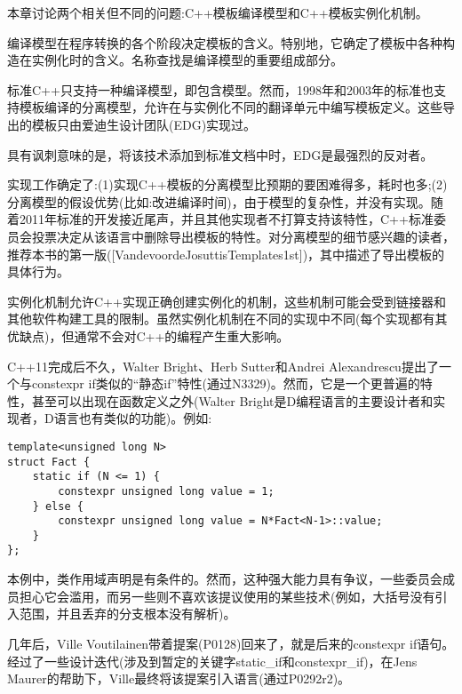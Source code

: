 本章讨论两个相关但不同的问题:C++模板编译模型和C++模板实例化机制。

编译模型在程序转换的各个阶段决定模板的含义。特别地，它确定了模板中各种构造在实例化时的含义。名称查找是编译模型的重要组成部分。

标准C++只支持一种编译模型，即包含模型。然而，1998年和2003年的标准也支持模板编译的分离模型，允许在与实例化不同的翻译单元中编写模板定义。这些导出的模板只由爱迪生设计团队(EDG)实现过。

\begin{tcolorbox}[colback=webgreen!5!white,colframe=webgreen!75!black]
\hspace*{0.75cm}具有讽刺意味的是，将该技术添加到标准文档中时，EDG是最强烈的反对者。
\end{tcolorbox}

实现工作确定了:(1)实现C++模板的分离模型比预期的要困难得多，耗时也多;(2)分离模型的假设优势(比如:改进编译时间)，由于模型的复杂性，并没有实现。随着2011年标准的开发接近尾声，并且其他实现者不打算支持该特性，C++标准委员会投票决定从该语言中删除导出模板的特性。对分离模型的细节感兴趣的读者，推荐本书的第一版([VandevoordeJosuttisTemplates1st])，其中描述了导出模板的具体行为。

实例化机制允许C++实现正确创建实例化的机制，这些机制可能会受到链接器和其他软件构建工具的限制。虽然实例化机制在不同的实现中不同(每个实现都有其优缺点)，但通常不会对C++的编程产生重大影响。

C++11完成后不久，Walter Bright、Herb Sutter和Andrei Alexandrescu提出了一个与constexpr if类似的“静态if”特性(通过N3329)。然而，它是一个更普遍的特性，甚至可以出现在函数定义之外(Walter Bright是D编程语言的主要设计者和实现者，D语言也有类似的功能)。例如:

\begin{lstlisting}[style=styleCXX]
template<unsigned long N>
struct Fact {
	static if (N <= 1) {
		constexpr unsigned long value = 1;
	} else {
		constexpr unsigned long value = N*Fact<N-1>::value;
	}
};
\end{lstlisting}

本例中，类作用域声明是有条件的。然而，这种强大能力具有争议，一些委员会成员担心它会滥用，而另一些则不喜欢该提议使用的某些技术(例如，大括号没有引入范围，并且丢弃的分支根本没有解析)。

几年后，Ville Voutilainen带着提案(P0128)回来了，就是后来的constexpr if语句。经过了一些设计迭代(涉及到暂定的关键字static\_if和constexpr\_if)，在Jens Maurer的帮助下，Ville最终将该提案引入语言(通过P0292r2)。



